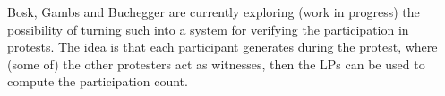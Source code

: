 Bosk, Gambs and Buchegger are currently exploring (work in progress) the 
possibility of turning such  into a system for verifying the 
participation in protests.
The idea is that each participant generates  during the protest, where 
(some of) the other protesters act as witnesses, then the \acp{LP} can be used 
to compute the participation count.

